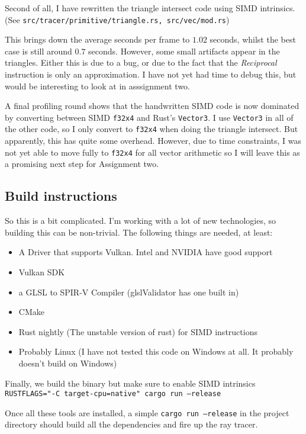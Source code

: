 \documentclass{article}
\begin{document}
Second of all, I have rewritten the triangle intersect code using SIMD intrinsics. (See \texttt{src/tracer/primitive/triangle.rs, src/vec/mod.rs})

This
brings down the average seconds per frame to $1.02$ seconds, whilst the best case is still around $0.7$ seconds.
However, some small artifacts appear in the triangles. Either this is due to a bug, or due to the fact that
the \emph{Reciprocal} instruction is only an approximation. I have not yet had time to debug this, but would be interesting to look at in asssignment two.

A final profiling round shows that the handwritten SIMD code is now dominated by converting between
SIMD \texttt{f32x4} and Rust's \texttt{Vector3}.  I use \texttt{Vector3} in all of the other code, so
I only convert to \texttt{f32x4} when doing the triangle intersect. But apparently, this has quite some overhead.
However, due to time constraints, I was not yet able to move fully to \texttt{f32x4} for all vector arithmetic so I will leave this as a promising next step for Assignment two.




\subsection{Build instructions}
So this is a bit complicated. I'm working with a lot of new technologies, so building this can be non-trivial.
The following things are needed, at least:
\begin{itemize}
    \item A Driver that supports Vulkan.  Intel and NVIDIA have good support
    \item Vulkan SDK
    \item a GLSL to SPIR-V Compiler (glslValidator has one built in)
    \item CMake
    \item Rust nightly (The unstable version of rust) for SIMD instructions
    \item Probably Linux (I have not tested this code on Windows at all. It probably doesn't build on Windows)
\end{itemize}

Finally, we build the binary but make sure to enable SIMD intrinsics \texttt{
  RUSTFLAGS="-C target-cpu=native" cargo run --release}

Once all these tools are installed,  a simple \texttt{cargo run --release} in the project directory should build
all the dependencies and fire up the ray tracer.
\end{document}
